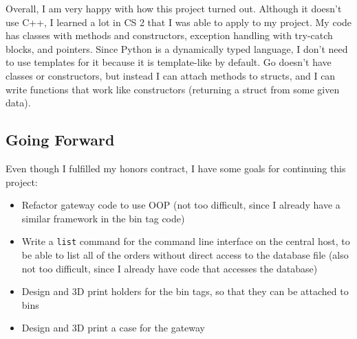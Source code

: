 \documentclass{article}
\begin{document}
Overall, I am very happy with how this project turned out. Although it
doesn't use C++, I learned a lot in CS 2 that I was able to apply to my
project. My code has classes with methods and constructors, exception
handling with try-catch blocks, and pointers. Since Python is a
dynamically typed language, I don't need to use templates for it because
it is template-like by default. Go doesn't have classes or constructors,
but instead I can attach methods to structs, and I can write functions
that work like constructors (returning a struct from some given data).

\subsection{Going Forward}\label{going-forward}

Even though I fulfilled my honors contract, I have some goals for
continuing this project:

\begin{itemize}
\item
  Refactor gateway code to use OOP (not too difficult, since I already
  have a similar framework in the bin tag code)
\item
  Write a \texttt{list} command for the command line interface on the
  central host, to be able to list all of the orders without direct
  access to the database file (also not too difficult, since I already
  have code that accesses the database)
\item
  Design and 3D print holders for the bin tags, so that they can be
  attached to bins
\item
  Design and 3D print a case for the gateway
\end{itemize}
\end{document}
